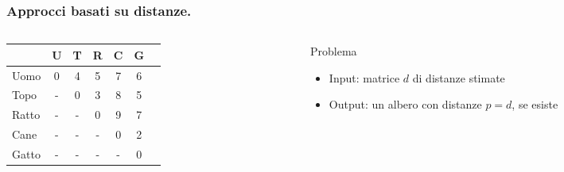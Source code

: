 \begin{frame}
        \frametitle{Approcci basati su distanze.}
        \begin{columns}
                \begin{column}{0.48\textwidth}
                        {
                                \begin{tabular}{l|cccccc}
                                              & U & T & R & C & G \\ \hline
                                        Uomo  & 0 & 4 & 5 & 7 & 6 \\
                                        Topo  & - & 0 & 3 & 8 & 5 \\
                                        Ratto & - & - & 0 & 9 & 7 \\
                                        Cane  & - & - & - & 0 & 2 \\
                                        Gatto & - & - & - & - & 0
                                \end{tabular}
                        }
                \end{column}
                \begin{column}{0.48\textwidth}
                        \begin{block}{Problema}
                                \begin{itemize}
                                        \item
                                              Input: matrice $d$ di distanze stimate
                                        \item
                                              Output: un albero con distanze $p = d$, se esiste
                                \end{itemize}
                        \end{block}
                \end{column}
        \end{columns}
\end{frame}




